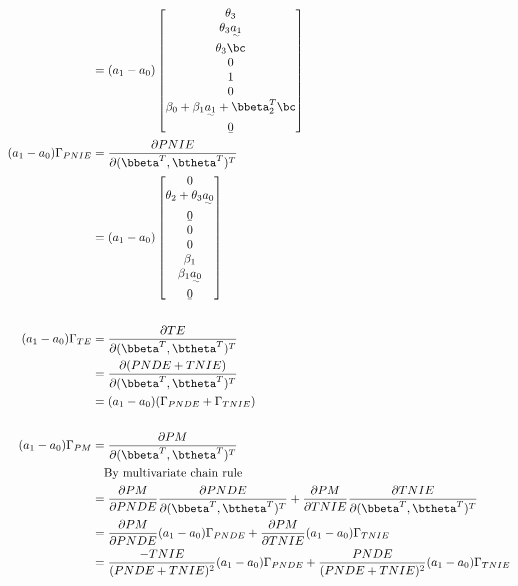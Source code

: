 \documentclass[10pt]{article}
\begin{document}
\begin{align*}
  &= (a_{1}-a_{0})
    \begin{bmatrix}
      \theta_{3}\\
      \theta_{3}\uwave{a_{1}}\\
      \theta_{3}\bc\\
      0\\
      1\\
      0\\
      \beta_{0} + \beta_{1}\uwave{a_{1}} + \bbeta_{2}^{T}\bc\\
      \b0\\
    \end{bmatrix}\\
  (a_{1}-a_{0})\Gamma_{PNIE}
  &= \frac{\partial PNIE}{\partial (\bbeta^{T},\btheta^{T})^{T}}\\
  &= (a_{1}-a_{0})
    \begin{bmatrix}
      0\\
      \theta_{2} + \theta_{3}\uwave{a_{0}}\\
      \b0\\
      0\\
      0\\
      \beta_{1}\\
      \beta_{1}\uwave{a_{0}}\\
      \b0\\
    \end{bmatrix}\\
  \\
  (a_{1}-a_{0})\Gamma_{TE}
  &= \frac{\partial TE}{\partial (\bbeta^{T},\btheta^{T})^{T}}\\
  &= \frac{\partial (PNDE+TNIE)}{\partial (\bbeta^{T},\btheta^{T})^{T}}\\
  &= (a_{1}-a_{0})(\Gamma_{PNDE} + \Gamma_{TNIE})\\
  \\
  (a_{1}-a_{0})\Gamma_{PM}
  &= \frac{\partial PM}{\partial (\bbeta^{T},\btheta^{T})^{T}}\\
  &~~~\text{By multivariate chain rule}\\
  &= \frac{\partial PM}{\partial PNDE}\frac{\partial PNDE}{\partial (\bbeta^{T},\btheta^{T})^{T}} + \frac{\partial PM}{\partial TNIE}\frac{\partial TNIE}{\partial (\bbeta^{T},\btheta^{T})^{T}}\\
  &= \frac{\partial PM}{\partial PNDE}(a_{1}-a_{0})\Gamma_{PNDE} + \frac{\partial PM}{\partial TNIE}(a_{1}-a_{0})\Gamma_{TNIE}\\
  &= \frac{-TNIE}{(PNDE+TNIE)^{2}}(a_{1}-a_{0})\Gamma_{PNDE} + \frac{PNDE}{(PNDE+TNIE)^{2}}(a_{1}-a_{0})\Gamma_{TNIE}\\

\end{align*}
\end{document}

